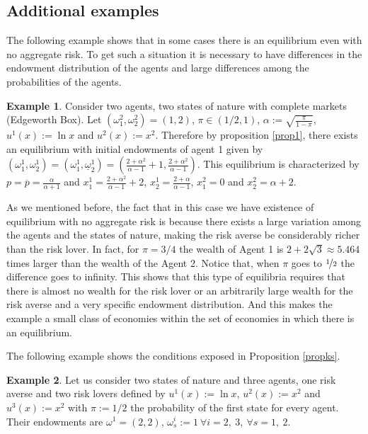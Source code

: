 \documentclass[pdftex]{article}
\numberwithin{equation}{section}
\theoremstyle{th}
\newtheorem{proof lemma}{{Proof Lemma}.}
\theoremstyle{definition}
\newtheorem{example}{Example}%
\newtheorem*{risk lovers}{Risk lovers}
\newtheorem*{risk averse}{Risk averse}
\begin{document}
{\subsection{Additional examples}
\label{examples}
The following example shows that in some cases there is an equilibrium even with no aggregate risk. To get such a situation it is necessary to have differences in the endowment distribution of the agents and large differences among the probabilities of the agents.

\begin{example}
\label{examplenoaggrisk}
Consider two agents, two states of nature with complete markets (Edgeworth Box). Let $\left(\omega_1^2,\omega_2^2\right)=(1,2)$, $\pi\in(1/2,1)$, $\alpha:=\sqrt{\frac{\pi}{1-\pi}}$, $u^1(x):=\ln{x}$ and $u^2(x):=x^2$. Therefore by proposition \ref{prop1}, there exists an equilibrium with initial endowments of agent 1 given by $\left(\omega_1^1,\omega_2^1\right)=\left(\omega_1^1,\underline{\omega}_2^1\right)=\left(\frac{2+\alpha^2}{\alpha-1}+1,\frac{2+\alpha^2}{\alpha-1}\right)$. This equilibrium is characterized by $p=\overline{p}=\frac{\alpha}{\alpha+1}$ and $x_1^1=\frac{2+\alpha^2}{\alpha-1}+2$, $x_2^1=\frac{2+\alpha}{\alpha-1}$, $x_1^2=0$ and $x_2^2=\alpha+2$.


\end{example}
As we mentioned before, the fact that in this case we have existence of equilibrium with no aggregate risk is because there exists a large variation among the agents and the states of nature, making the risk averse be considerably richer than the risk lover. In fact, for $\pi=3/4$ the wealth of Agent 1 is $2+2\sqrt{3}\approx5.464$ times larger than the wealth of the Agent 2. Notice that, when $\pi$ goes to $\nicefrac{1}{2}$ the difference goes to infinity. This shows that this type of equilibria requires that there is almost no wealth for the risk lover or an arbitrarily large wealth for the risk averse and a very specific endowment distribution. And this makes the example a small class of economies within the set of economies in which there is an equilibrium.

The following example shows the conditions exposed in Proposition \ref{propks}.
\begin{example}
\label{example3agents}
Let us consider two states of nature and three agents, one risk averse and two risk lovers defined by $u^1(x):=\ln{x}$, $u^2(x):=x^2$ and $u^3(x):=x^2$ with $\pi:=1/2$ the probability of the first state for every agent. Their endowments are $\omega^1=(2,2)$, $\omega_s^i:=1\ \forall{i=2,\ 3},\ \forall{s=1,\ 2}$.


\end{example}}
\end{document}

